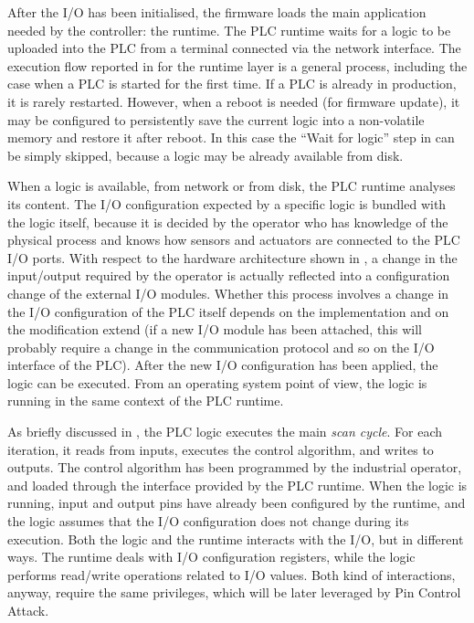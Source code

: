 After the I/O has been initialised, the firmware loads the main application needed by the controller: the runtime.
The PLC runtime waits for a logic to be uploaded into the PLC from a terminal connected via the network interface.
The execution flow reported in  for the runtime layer is a general process, including the case when a PLC is started for the first time.
If a PLC is already in production, it is rarely restarted. However, when a reboot is needed (\eg for firmware update),
it may be configured to persistently save the current logic into a non-volatile memory and restore it after reboot.
In this case the ``Wait for logic'' step in  can be simply skipped, because a logic may be already available from disk.

When a logic is available, from network or from disk, the PLC runtime analyses its content.
The I/O configuration expected by a specific logic is bundled with the logic itself, because it is decided by the operator who has knowledge of the physical process
and knows how sensors and actuators are connected to the PLC I/O ports. With respect to the hardware architecture shown in ,
a change in the input/output required by the operator is actually reflected into a configuration change of the external I/O modules.
Whether this process involves a change in the I/O configuration of the PLC itself depends on the implementation and on the modification extend
(\eg if a new I/O module has been attached, this will probably require a change in the communication protocol and so on the I/O interface of the PLC).
After the new I/O configuration has been applied, the logic can be executed. From an operating system point of view, the logic is running in the same context of the PLC runtime.

As briefly discussed in , the PLC logic executes the main \emph{scan cycle}. For each iteration, it reads from inputs, executes the control algorithm,
and writes to outputs. The control algorithm has been programmed by the industrial operator, and loaded through the interface provided by the PLC runtime.
When the logic is running, input and output pins have already been configured by the runtime, and the logic assumes that the I/O configuration does not change during its execution.
Both the logic and the runtime interacts with the I/O, but in different ways. The runtime deals with I/O configuration registers, while the logic performs read/write operations
related to I/O values. Both kind of interactions, anyway, require the same privileges, which will be later leveraged by Pin Control Attack.


